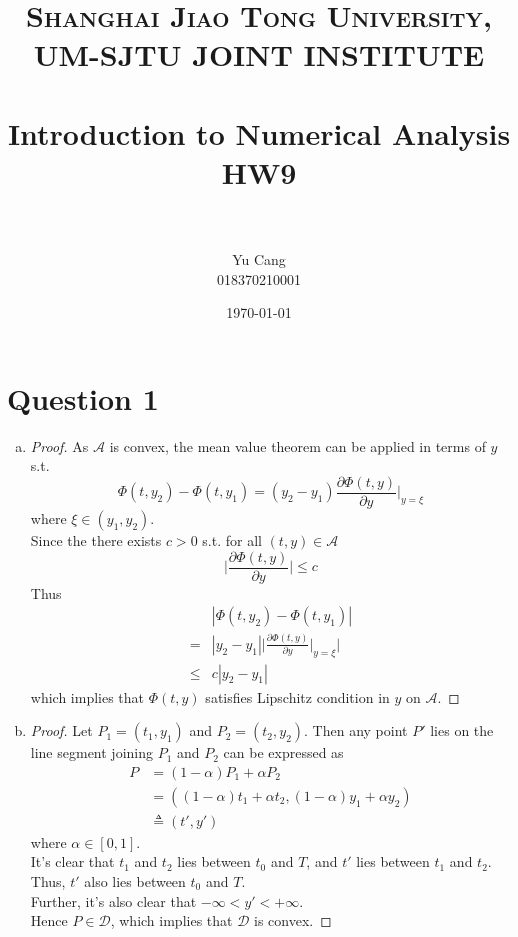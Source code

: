 \documentclass[paper=a4, fontsize=11pt]{scrartcl} %
\title{	
\normalfont \normalsize 
\textsc{Shanghai Jiao Tong University, UM-SJTU JOINT INSTITUTE} \\ [25pt] %
\horrule{0.5pt} \\[0.4cm] %
\huge Introduction to Numerical Analysis \\ HW9 \\ %
\horrule{2pt} \\[0.5cm] %
}
\author{Yu Cang \\ 018370210001} %
\date{\normalsize \today} %
\numberwithin{equation}{section} %
\numberwithin{figure}{section} %
\numberwithin{table}{section} %
\begin{document}
\maketitle %

\section{Question 1}
	\begin{enumerate}[(a)]
		\item
			\begin{proof}
				As $\mathcal{A}$ is convex, the mean value theorem can be applied in terms of $y$ s.t.
				\begin{equation}
					\Phi(t, y_2) - \Phi(t, y_1) = (y_2 - y_1) \frac{\partial \Phi(t, y)}{\partial y}\Big|_{y=\xi} 
				\end{equation}
				where $\xi \in (y_1, y_2)$.\\
				Since the there exists $c>0$ s.t. for all $(t, y)\in \mathcal{A}$
				\begin{equation}
					\Big| \frac{\partial \Phi(t, y)}{\partial y} \Big| \leq c
				\end{equation}
				Thus
				\begin{equation}
					\begin{aligned}
						& |\Phi(t, y_2) - \Phi(t, y_1)|\\
					  = & |y_2 - y_1| \Bigg| \frac{\partial \Phi(t, y)}{\partial y}\Big|_{y=\xi} \Bigg|\\
				   \leq & c |y_2 - y_1|	
					\end{aligned}
				\end{equation}
				which implies that $\Phi(t, y)$ satisfies Lipschitz condition in $y$ on $\mathcal{A}$.
			\end{proof}
				
		\item 
			\begin{proof}
				Let $P_1 = (t_1, y_1)$ and $P_2 = (t_2, y_2)$. Then any point $P'$ lies on the line segment joining $P_1$ and $P_2$ can be expressed as
				\begin{equation}
					\begin{aligned}
						P & = (1-\alpha)P_1 + \alpha P_2\\
						  & = ((1-\alpha)t_1 + \alpha t_2, (1-\alpha)y_1 + \alpha y_2)\\
						  & \triangleq (t', y')
					\end{aligned}
				\end{equation} 
				where $\alpha \in [0, 1]$.\\
				It's clear that $t_1$ and $t_2$ lies between $t_0$ and $T$, and $t'$ lies between $t_1$ and $t_2$. Thus, $t'$ also lies between $t_0$ and $T$.\\
				Further, it's also clear that $-\infty < y' < +\infty$.\\
				Hence $P \in \mathcal{D}$, which implies that $\mathcal{D}$ is convex.
			\end{proof}
		

\end{enumerate}
\end{document}
